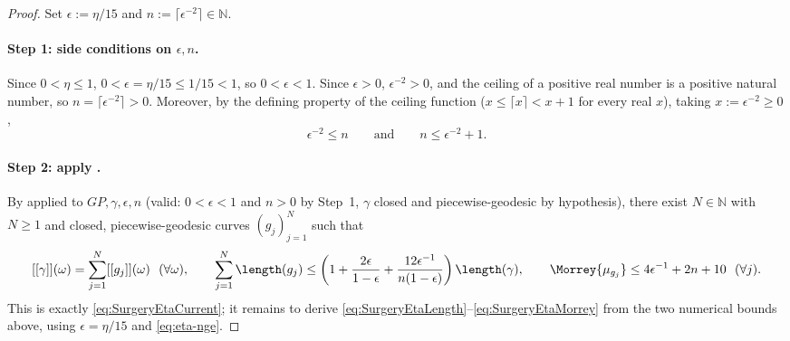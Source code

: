 \begin{proof}
  Set $\epsilon := \eta/15$ and $n := \lceil \epsilon^{-2}\rceil \in \mathbb{N}$.

  \paragraph{Step 1: side conditions on $\epsilon,n$.} Since $0<\eta\le1$,
  $0<\epsilon=\eta/15\le1/15<1$, so $0<\epsilon<1$. Since $\epsilon>0$, $\epsilon^{-2}>0$, and the
  ceiling of a positive real number is a positive natural number, so $n=\lceil\epsilon^{-2}
  \rceil>0$. Moreover, by the defining property of the ceiling function ($x\le\lceil x\rceil<x+1$
  for every real $x$), taking $x:=\epsilon^{-2}\ge0$,
  \begin{equation}
    \label{eq:eta-nge}
    \epsilon^{-2} \le n
    \qquad\text{and}\qquad
    n \le \epsilon^{-2}+1
    .
  \end{equation}

  \paragraph{Step 2: apply .} By  applied to
  $GP,\gamma,\epsilon,n$ (valid: $0<\epsilon<1$ and $n>0$ by Step~1, $\gamma$ closed and
  piecewise-geodesic by hypothesis), there exist $N\in\mathbb{N}$ with $N\ge1$ and closed,
  piecewise-geodesic curves $(g_j)_{j=1}^N$ such that
  \[
    [[\gamma]](\omega)=\sum_{j=1}^N[[g_j]](\omega)\ \ (\forall\omega), \qquad
    \sum_{j=1}^N\length(g_j) \le \left(1+\frac{2\epsilon}{1-\epsilon}+
    \frac{12\epsilon^{-1}}{n(1-\epsilon)}\right)\length(\gamma), \qquad
    \Morrey{\mu_{g_j}}\le4\epsilon^{-1}+2n+10\ \ (\forall j)
    .
  \]
  This is exactly \eqref{eq:SurgeryEtaCurrent}; it remains to derive
  \eqref{eq:SurgeryEtaLength}--\eqref{eq:SurgeryEtaMorrey} from the two numerical bounds above,
  using $\epsilon=\eta/15$ and \eqref{eq:eta-nge}.


\end{proof}
